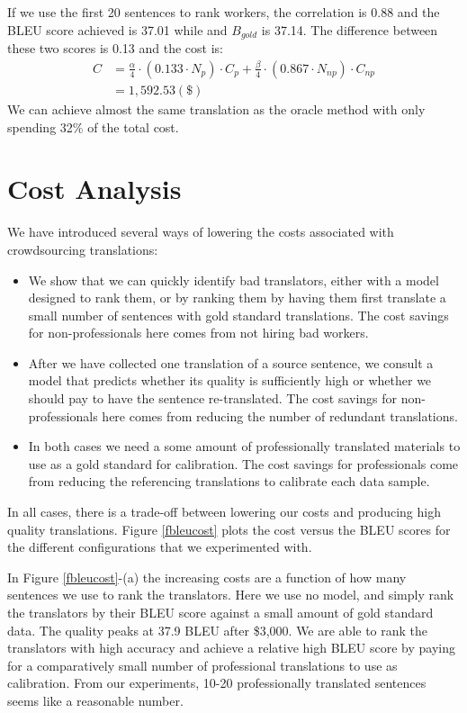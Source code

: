 \documentclass[11pt,letterpaper]{article}
\begin{document}
If we use the first 20 sentences to rank workers, the correlation is 0.88 and  the BLEU score achieved is 37.01 while  and $B_{gold}$ is 37.14. The difference between these two scores is 0.13 and the cost is: \\
  \begin{align*}
  C& = \frac{\alpha}{4} \cdot  (0.133 \cdot N_{p}) \cdot C_{p}  + \frac{\beta }{4}\cdot (0.867\cdot N_{np} ) \cdot C_{np}\\
   & = 1,592.53 (\$)
  \end{align*}  
We can achieve almost the same translation as the oracle method with only spending 32\% of the total cost. 


\section{Cost Analysis}

 We have introduced several ways of lowering the costs associated with crowdsourcing translations:
\begin{itemize}
\item We show that we can quickly identify bad translators, either with a model designed to rank them, or by ranking them by having them first translate a small number of sentences with gold standard translations. The cost savings for non-professionals here comes from not hiring bad workers.
\item After we have collected one translation of a source sentence, we consult a model that predicts whether its quality is sufficiently high or whether we should pay to have the sentence re-translated.  The cost savings for non-professionals here comes from reducing the number of redundant translations.
\item In both cases we need a some amount of professionally translated materials  to use as a gold standard for calibration. The cost savings for professionals come from reducing the referencing translations to calibrate each data sample. 
\end{itemize}
In all cases, there is a trade-off between lowering our costs and producing high quality translations.  Figure \ref{fbleucost} plots the cost versus the BLEU scores for the different configurations that we experimented with.

In Figure \ref{fbleucost}-(a) the increasing costs are a function of how many sentences we use to rank the translators.  Here we use no model, and simply rank the translators by their BLEU score against a small amount of gold standard data. The quality peaks at 37.9 BLEU after \$3,000.
We are able to rank the translators with high accuracy and achieve a relative high BLEU score by paying for a comparatively small number of professional translations to use as calibration. From our experiments,  10-20 professionally translated sentences seems like a reasonable number. 
\end{document}
